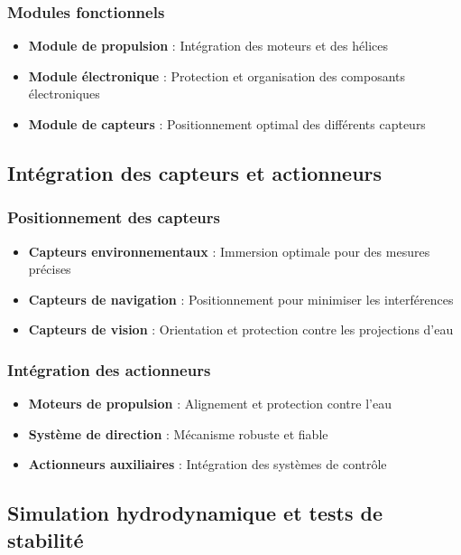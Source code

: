 {\subsubsection{Modules fonctionnels}
\begin{itemize}
    \item \textbf{Module de propulsion} : Intégration des moteurs et des hélices
    \item \textbf{Module électronique} : Protection et organisation des composants électroniques
    \item \textbf{Module de capteurs} : Positionnement optimal des différents capteurs
\end{itemize}

\subsection{Intégration des capteurs et actionneurs}
\subsubsection{Positionnement des capteurs}
\begin{itemize}
    \item \textbf{Capteurs environnementaux} : Immersion optimale pour des mesures précises
    \item \textbf{Capteurs de navigation} : Positionnement pour minimiser les interférences
    \item \textbf{Capteurs de vision} : Orientation et protection contre les projections d'eau
\end{itemize}

\subsubsection{Intégration des actionneurs}
\begin{itemize}
    \item \textbf{Moteurs de propulsion} : Alignement et protection contre l'eau
    \item \textbf{Système de direction} : Mécanisme robuste et fiable
    \item \textbf{Actionneurs auxiliaires} : Intégration des systèmes de contrôle
\end{itemize}

\subsection{Simulation hydrodynamique et tests de stabilité}
}
